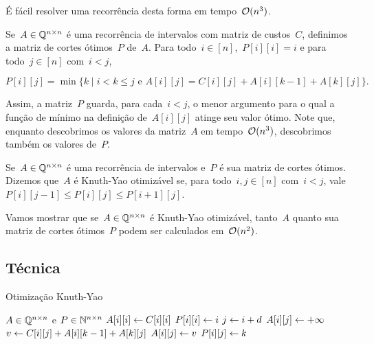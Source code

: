 É fácil resolver uma recorrência desta forma em tempo~$\mathcal{O}(n^3)$. 

\begin{defi}
Se~$A \in \mathbb{Q}^{n \times n}$ é uma recorrência de intervalos com matriz de custos~$C$, definimos a matriz de cortes ótimos~$P$ de~$A$. Para todo~$i \in [n]$,~$P[i][i] = i$ e para todo~$j \in [n]$ com~$i < j$, 

$$P[i][j] = \min\{k \mid i < k \leq j \text{ e } A[i][j] = C[i][j] + A[i][k-1] + A[k][j]\} \text{.}$$
\end{defi}

Assim, a matriz~$P$ guarda, para cada~$i < j$, o menor argumento para o qual a função de mínimo na definição de~$A[i][j]$ atinge seu valor ótimo. Note que, enquanto descobrimos os valores da matriz~$A$ em tempo~$\mathcal{O}(n^3)$, descobrimos também os valores de~$P$.

\begin{defi}
Se~$A \in \mathbb{Q}^{n \times n}$ é uma recorrência de intervalos e~$P$ é sua matriz de cortes ótimos. Dizemos que~$A$ é Knuth-Yao otimizável se, para todo~$i,j \in [n]$ com~$i < j$, vale~${P[i][j-1] \leq P[i][j] \leq P[i+1][j]}$.
\end{defi}

Vamos mostrar que se~$A \in \mathbb{Q}^{n \times n}$ é Knuth-Yao otimizável, tanto~$A$ quanto sua matriz de cortes ótimos~$P$ podem ser calculados em~$\mathcal{O}(n^2)$.


\subsection{Técnica}

\newcommand{\KY}{\textsc{KnuthYao}}
\begin{algorithm}[h]
\caption{Otimização Knuth-Yao}
\label{KY:algo}
\begin{algorithmic}[1]
\Function{\KY}{C, n}
    \State $A \in \mathbb{Q}^{n \times n}$ e $P \in \mathbb{N}^{n \times n}$
        \State $A[i][i] \leftarrow C[i][i]$
        \State $P[i][i] \leftarrow i$
    \EndFor
            \State $j \leftarrow i+d$
            \State $A[i][j] \leftarrow +\infty$
             \label{KY:algo:loop}
                \State $v \leftarrow C[i][j] + A[i][k-1] + A[k][j]$
                    \State $A[i][j] \leftarrow v$
                    \State $P[i][j] \leftarrow k$
                \EndIf
            \EndFor
        \EndFor
    \EndFor
\EndFunction
\end{algorithmic}
\end{algorithm}

